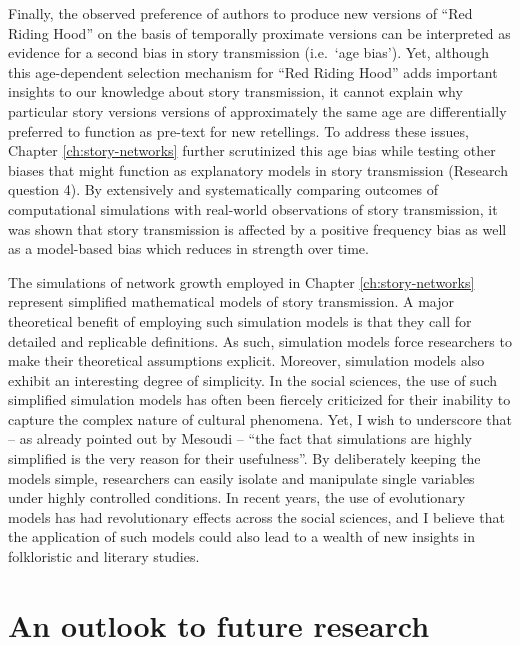 Finally, the observed preference of authors to produce new versions of ``Red Riding Hood'' on the basis of temporally proximate versions can be interpreted as evidence for a second bias in story transmission (i.e.\ `age bias'). Yet, although this age-dependent selection mechanism for ``Red Riding Hood'' adds important insights to our knowledge about story transmission, it cannot explain why particular story versions versions of approximately the same age are differentially preferred to function as pre-text for new retellings. To address these issues, Chapter \ref{ch:story-networks} further scrutinized this age bias while testing other biases that might function as explanatory models in story transmission (Research question 4). By extensively and systematically comparing outcomes of computational simulations with real-world observations of story transmission, it was shown that story transmission is affected by a positive frequency bias as well as a model-based bias which reduces in strength over time.

The simulations of network growth employed in Chapter \ref{ch:story-networks} represent simplified mathematical models of story transmission. A major theoretical benefit of employing such simulation models is that they call for detailed and replicable definitions. As such, simulation models force researchers to make their theoretical assumptions explicit. Moreover, simulation models also exhibit an interesting degree of simplicity. In the social sciences, the use of such simplified simulation models has often been fiercely criticized for their inability to capture the complex nature of cultural phenomena\autocite{mesoudi:2011}. Yet, I wish to underscore that -- as already pointed out by Mesoudi -- ``the fact that simulations are highly simplified is the very reason for their usefulness''\autocite[326]{mesoudi:2005}. By deliberately keeping the models simple, researchers can easily isolate and manipulate single variables under highly controlled conditions\autocite{mesoudi:2005,mesoudi:2011}. In recent years, the use of evolutionary models has had revolutionary effects across the social sciences\autocite{mesoudi:2015}, and I believe that the application of such models could also lead to a wealth of new insights in folkloristic and literary studies.

\section{An outlook to future research}


